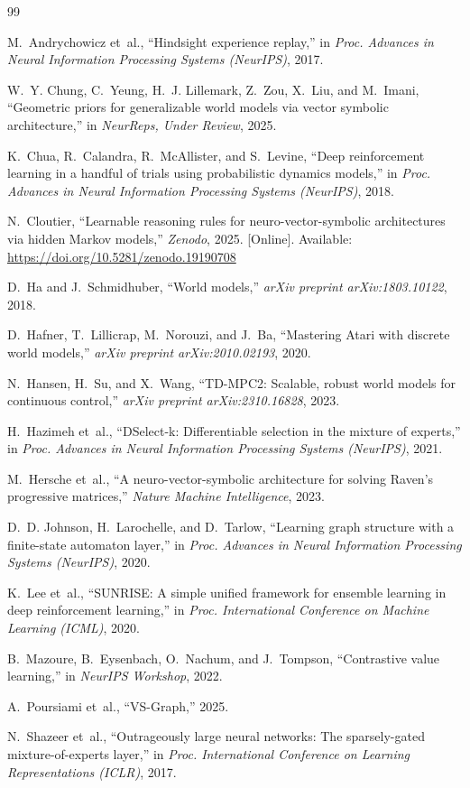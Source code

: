 \documentclass[journal]{IEEEtai}
\begin{document}
\begin{thebibliography}{99}

M.~Andrychowicz et~al., ``Hindsight experience replay,'' in \emph{Proc. Advances in Neural Information Processing Systems (NeurIPS)}, 2017.

W.~Y. Chung, C.~Yeung, H.~J. Lillemark, Z.~Zou, X.~Liu, and M.~Imani, ``Geometric priors for generalizable world models via vector symbolic architecture,'' in \emph{NeurReps, Under Review}, 2025.

K.~Chua, R.~Calandra, R.~McAllister, and S.~Levine, ``Deep reinforcement learning in a handful of trials using probabilistic dynamics models,'' in \emph{Proc. Advances in Neural Information Processing Systems (NeurIPS)}, 2018.

N.~Cloutier, ``Learnable reasoning rules for neuro-vector-symbolic architectures via hidden Markov models,'' \emph{Zenodo}, 2025. [Online]. Available: \url{https://doi.org/10.5281/zenodo.19190708}

D.~Ha and J.~Schmidhuber, ``World models,'' \emph{arXiv preprint arXiv:1803.10122}, 2018.

D.~Hafner, T.~Lillicrap, M.~Norouzi, and J.~Ba, ``Mastering Atari with discrete world models,'' \emph{arXiv preprint arXiv:2010.02193}, 2020.

N.~Hansen, H.~Su, and X.~Wang, ``TD-MPC2: Scalable, robust world models for continuous control,'' \emph{arXiv preprint arXiv:2310.16828}, 2023.

H.~Hazimeh et~al., ``DSelect-k: Differentiable selection in the mixture of experts,'' in \emph{Proc. Advances in Neural Information Processing Systems (NeurIPS)}, 2021.

M.~Hersche et~al., ``A neuro-vector-symbolic architecture for solving Raven's progressive matrices,'' \emph{Nature Machine Intelligence}, 2023.

D.~D. Johnson, H.~Larochelle, and D.~Tarlow, ``Learning graph structure with a finite-state automaton layer,'' in \emph{Proc. Advances in Neural Information Processing Systems (NeurIPS)}, 2020.

K.~Lee et~al., ``SUNRISE: A simple unified framework for ensemble learning in deep reinforcement learning,'' in \emph{Proc. International Conference on Machine Learning (ICML)}, 2020.

B.~Mazoure, B.~Eysenbach, O.~Nachum, and J.~Tompson, ``Contrastive value learning,'' in \emph{NeurIPS Workshop}, 2022.

A.~Poursiami et~al., ``VS-Graph,'' 2025.

N.~Shazeer et~al., ``Outrageously large neural networks: The sparsely-gated mixture-of-experts layer,'' in \emph{Proc. International Conference on Learning Representations (ICLR)}, 2017.

\end{thebibliography}
\end{document}
